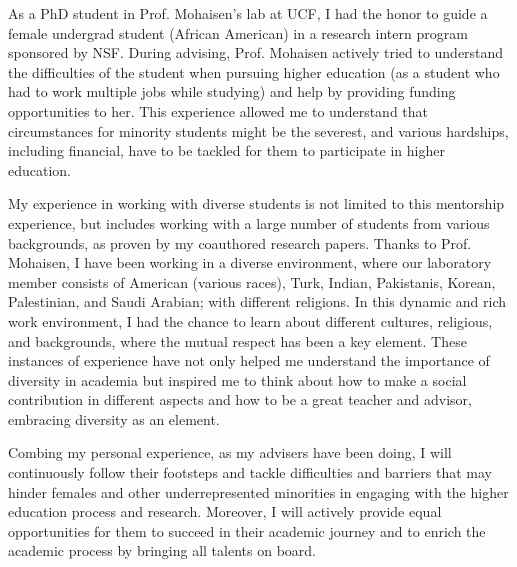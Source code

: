 \documentclass{NSF}
\begin{document}
As a PhD student in Prof. Mohaisen's lab at UCF, I had the honor to guide a female undergrad student (African American) in a research intern program sponsored by NSF. During advising, Prof. Mohaisen actively tried to understand the difficulties of the student when pursuing higher education (as a student who had to work multiple jobs while studying) and help by providing funding opportunities to her. This experience allowed me to understand that circumstances for minority students might be the severest, and various hardships, including financial, have to be tackled for them to participate in higher education. 

My experience in working with diverse students is not limited to this mentorship experience, but includes working with a large number of students from various backgrounds, as proven by my coauthored research papers. Thanks to Prof. Mohaisen, I have been working in a diverse environment, where our laboratory member consists of American (various races), Turk, Indian, Pakistanis, Korean, Palestinian, and Saudi Arabian; with different religions. In this dynamic and rich work environment, I had the chance to learn about different cultures, religious, and backgrounds, where the mutual respect has been a key element.
These instances of experience have not only helped me understand the importance of diversity in academia but inspired me to think about how to make a social contribution in different aspects and how to be a great teacher and advisor, embracing diversity as an element.

Combing my personal experience, as my advisers have been doing, I will continuously follow their footsteps and tackle difficulties and barriers that may hinder females and other underrepresented minorities in engaging with the higher education process and research. Moreover,  I will actively provide equal opportunities for them to succeed in their academic journey and to enrich the academic process by bringing all talents on board. 
\end{document}
